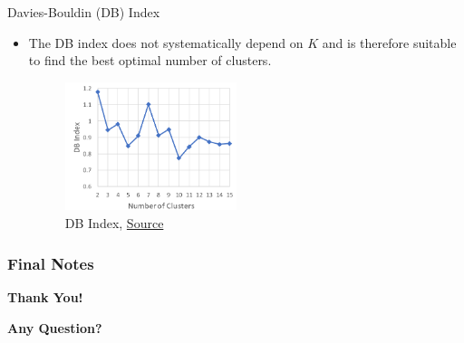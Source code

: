 \documentclass[compress,oilve]{beamer}
\begin{document}
\begin{frame}{Davies-Bouldin (DB) Index}
	\begin{itemize}
		\item The DB index does not systematically depend on $K$ and is therefore suitable to find the best optimal number of clusters.

		\begin{figure}
		\includegraphics[width=5cm, height=3.75cm]{Figs/5.png}
		\caption{DB Index, \href{https://tinyurl.com/2hyqttw8}{Source}}
	\end{figure}
	\end{itemize}

\end{frame}

\frametitle{Final Notes}
\centering
\vspace{50 pt}
\textbf{Thank You!}
\vspace{50pt}

\textbf{Any Question?}
\end{document}

